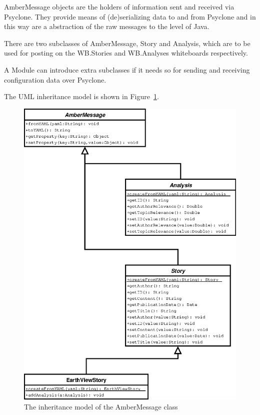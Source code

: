 AmberMessage objects are the holders of information sent and received via
Psyclone. They provide means of (de)serializing data to and from Psyclone and
in this way are a abstraction of the raw messages to the level of Java.

There are two subclasses of AmberMessage, Story and Analysis, which are to be
used for posting on the WB.Stories and WB.Analyses whiteboards respectively.

A Module can introduce extra subclasses if it needs so for sending and
receiving configuration data over Psyclone.

The UML inheritance model is shown in
Figure~\ref{fig:class-diagram-ambermessage}.

\begin{figure}[htp]
  \centering
  \includegraphics{design/image/class-diagram-ambermessage}
  \caption{
    \label{fig:class-diagram-ambermessage}
    The inheritance model of the AmberMessage class}
\end{figure}

